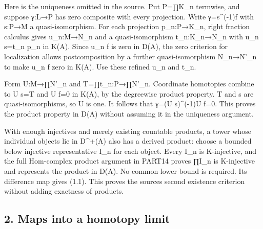 \documentclass[11pt]{article}
\begin{document}
Here is the uniqueness omitted in the source. Put P\allowbreak{}=∏K\_\allowbreak{}n termwise,\allowbreak{} and suppose γ:\allowbreak{}L\allowbreak{}→P has zero composite with every projection. Write γ\allowbreak{}=s\textasciicircum{}(-1)\allowbreak{}f with s:\allowbreak{}P\allowbreak{}→M a quasi-isomorphism. For each projection p\_\allowbreak{}n:\allowbreak{}P\allowbreak{}→K\_\allowbreak{}n,\allowbreak{} right fraction calculus gives u\_\allowbreak{}n:\allowbreak{}M\allowbreak{}→N\_\allowbreak{}n and a quasi-isomorphism t\_\allowbreak{}n:\allowbreak{}K\_\allowbreak{}n\allowbreak{}→N\_\allowbreak{}n with u\_\allowbreak{}n s\allowbreak{}=t\_\allowbreak{}n p\_\allowbreak{}n in K(A)\allowbreak{}. Since u\_\allowbreak{}n f is zero in D(A)\allowbreak{},\allowbreak{} the zero criterion for localization allows postcomposition by a further quasi-isomorphism N\_\allowbreak{}n\allowbreak{}→N'\_\allowbreak{}n to make u\_\allowbreak{}n f zero in K(A)\allowbreak{}. Use these refined u\_\allowbreak{}n and t\_\allowbreak{}n.

Form U:\allowbreak{}M\allowbreak{}→∏N'\_\allowbreak{}n and T\allowbreak{}=∏t\_\allowbreak{}n:\allowbreak{}P\allowbreak{}→∏N'\_\allowbreak{}n. Coordinate homotopies combine to U s\allowbreak{}=T and U f\allowbreak{}=0 in K(A)\allowbreak{},\allowbreak{} by the degreewise product property. T and s are quasi-isomorphisms,\allowbreak{} so U is one. It follows that γ\allowbreak{}=(U s)\allowbreak{}\textasciicircum{}(-1)\allowbreak{}U f\allowbreak{}=0. This proves the product property in D(A)\allowbreak{} without assuming it in the uniqueness argument.

With enough injectives and merely existing countable products,\allowbreak{} a tower whose individual objects lie in D\textasciicircum{}\allowbreak{}+(A)\allowbreak{} also has a derived product:\allowbreak{} choose a bounded below injective representative I\_\allowbreak{}n for each object. Every I\_\allowbreak{}n is K-injective,\allowbreak{} and the full Hom-complex product argument in PART14 proves ∏I\_\allowbreak{}n is K-injective and represents the product in D(A)\allowbreak{}. No common lower bound is required. Its difference map gives (1.1)\allowbreak{}. This proves the source\textquotesingle s second existence criterion without adding exactness of products.

\subsection{2. Maps into a homotopy limit}\label{proofs-10435-10686-maps-into-a-homotopy-limit}
\end{document}
